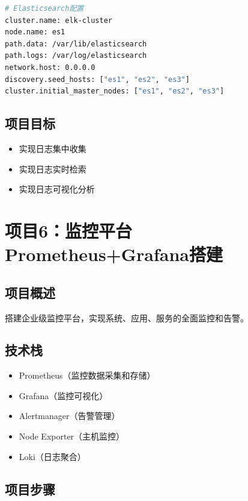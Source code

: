 \documentclass[12pt,UTF8]{ctexbook}
\begin{document}
\begin{lstlisting}[language=bash]
# Elasticsearch配置
cluster.name: elk-cluster
node.name: es1
path.data: /var/lib/elasticsearch
path.logs: /var/log/elasticsearch
network.host: 0.0.0.0
discovery.seed_hosts: ["es1", "es2", "es3"]
cluster.initial_master_nodes: ["es1", "es2", "es3"]
\end{lstlisting}

\subsection*{项目目标}

\begin{itemize}
    \item 实现日志集中收集
    \item 实现日志实时检索
    \item 实现日志可视化分析
\end{itemize}

\section{项目6：监控平台Prometheus+Grafana搭建}
\label{sec:project-prometheus}

\subsection*{项目概述}

搭建企业级监控平台，实现系统、应用、服务的全面监控和告警。

\subsection*{技术栈}

\begin{itemize}
    \item Prometheus（监控数据采集和存储）
    \item Grafana（监控可视化）
    \item Alertmanager（告警管理）
    \item Node Exporter（主机监控）
    \item Loki（日志聚合）
\end{itemize}

\subsection*{项目步骤}
\end{document}
